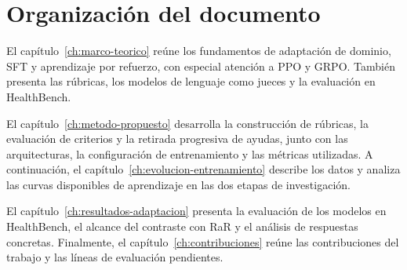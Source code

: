 \section{Organización del documento}
El capítulo~\ref{ch:marco-teorico} reúne los fundamentos de adaptación de dominio, SFT y aprendizaje por refuerzo, con especial atención a PPO y GRPO. También presenta las rúbricas, los modelos de lenguaje como jueces y la evaluación en HealthBench.

El capítulo~\ref{ch:metodo-propuesto} desarrolla la construcción de rúbricas, la evaluación de criterios y la retirada progresiva de ayudas, junto con las arquitecturas, la configuración de entrenamiento y las métricas utilizadas. A continuación, el capítulo~\ref{ch:evolucion-entrenamiento} describe los datos y analiza las curvas disponibles de aprendizaje en las dos etapas de investigación.

El capítulo~\ref{ch:resultados-adaptacion} presenta la evaluación de los modelos en HealthBench, el alcance del contraste con RaR y el análisis de respuestas concretas. Finalmente, el capítulo~\ref{ch:contribuciones} reúne las contribuciones del trabajo y las líneas de evaluación pendientes.
